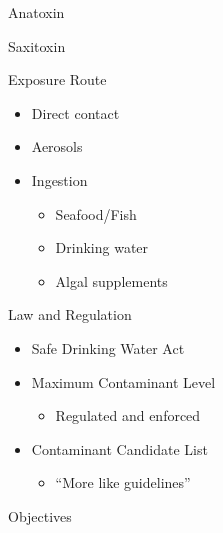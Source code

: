\begin{frame}{Anatoxin}

\end{frame}
\begin{frame}{Saxitoxin}

\end{frame}
\begin{frame}{Exposure Route}

	\begin{itemize}
		\item Direct contact
		\item Aerosols
		\item Ingestion
		\begin{itemize}
			\item Seafood/Fish 
			\item Drinking water
			\item Algal supplements
		\end{itemize}
	\end{itemize}

\end{frame}
\begin{frame}{Law and Regulation}

	\begin{itemize}
		\item Safe Drinking Water Act
		\item Maximum Contaminant Level
		\begin{itemize}
			\item Regulated and enforced
		\end{itemize}
		\item Contaminant Candidate List
		\begin{itemize}
			\item ``More like guidelines''
		\end{itemize}
	\end{itemize}
\end{frame}
\begin{frame}{Objectives}

\end{frame}

